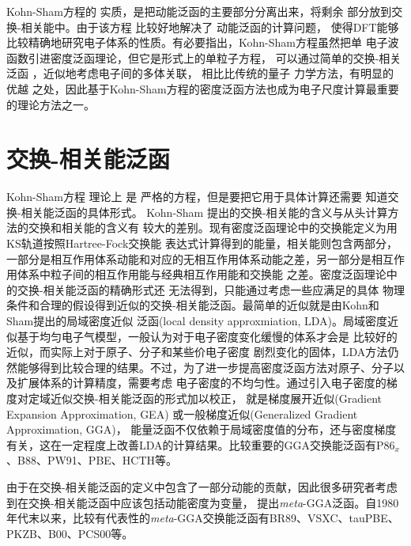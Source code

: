 Kohn-Sham方程的%
实质，是把动能泛函的主要部分分离出来，将剩余%
部分放到交换-相关能中。由于该方程%
{比较好地}解决了%
动能泛函的{计算}问题，%
使得DFT能够比较精确地研究电子体系的性质。有必要指出，Kohn-Sham方程虽然把单%
{电}子波函数引进密度泛函理论，但它是{形式上}的单粒子方程，%
可以通过简单的交换-相关泛函%
{，近似地考虑}电子间的多体关联，%
{相比}比传统的量子%
{力}学方法，有明显的%
优越%
{之处}，{因此}基于Kohn-Sham方程的密度泛函方法也成为电子尺度计算最重要的{理论}方法之一。

\section{交换-相关能泛函}
Kohn-Sham方程%
理论上%
是%
严格的方程，但是要把它用于具体计算还需要%
{知道}交换-相关能泛函的具体形式。%
Kohn-Sham%
提出的交换-相关能的含义与从头计算方法的交换和相关能的含义有%
{较}大的差别{。现有}密度泛函理论中的交换能定义为用KS轨道按照Hartree-Fock交换能%
{表达}式计算得到的能量，相关能则包含两部分，一部分是相互作用体系动能和对应的无相互作用体系动能{之}差，另一部分是相互作用体系中粒子间的相互作用能与经典相互作用{能}和交换能%
{之}差。密度泛函{理论}中的交换-相关能泛函的精确形式还%
{无法}得到，只能通过{考虑}一些{应满足的}具体%
物理%
{条件}和合理的假设得到近似的交换-相关能泛函。最简单的近似就是由Kohn和Sham提出的局域密度近似%
{泛函}\cite{PRA140-1133_1965}(local density approxmiation, LDA){。}局域密度近似基于均匀电子气模型，一般认为对于电子密度变化缓慢的体系{才会}是%
比较好的近似，而实际上对于原子、分子和某些价电子密度%
剧烈变化的固体，LDA方法仍然能够得到比较合理的结果。不过，为了进一步提高密度泛函方法对原子、分子以及扩展体系的计算精度，需要考虑%
电子密度的不均匀性。通过引入电子密度的梯度对{定域近似}交换-相关能{泛函}的形式加以校正，%
{就是}梯度展开近似(Gradient Expansion Approximation, GEA)%
{或}一般梯度近似(Generalized Gradient Approximation, GGA)，%
能量泛函不仅依赖于局域密度值的分布，还与密度梯度有关，这在一定程度上改善LDA的计算结果。比较重要的GGA交换能泛函有P86$_x$\cite{PRB33-8800_1986}、B88\cite{PRA38-3098_1988}、PW91\cite{PRB46-6671_1992,PRB48-4978_1993,PRB54-16533_1996,PRB57-14999_1998}、PBE\cite{PRL77-1396_1996,IBID78-1396_1997}、HCTH\cite{JCP109-6264_1998}等。

由于在交换-相关能泛函的定义中包含了一部分动能的贡献，因此很多研究者考虑{到}在交换-相关{能}泛函中应该包括动能密度为变量，%
{提出}\textit{meta}-GGA泛函。自1980年代末以来，比较有代表性的\textit{meta}-GGA交换能泛函有BR89\cite{PRA39-3761_1989}、\linebreak VSXC\cite{JCP109-400_1998}、tauPBE\cite{JCP111-911_1999}、PKZB\cite{PRL82-2544_1999,PRL82-5179_1999}、B00\cite{JCP112-4020_2000}、PCS00\cite{JCP113-10013_2000}等。

